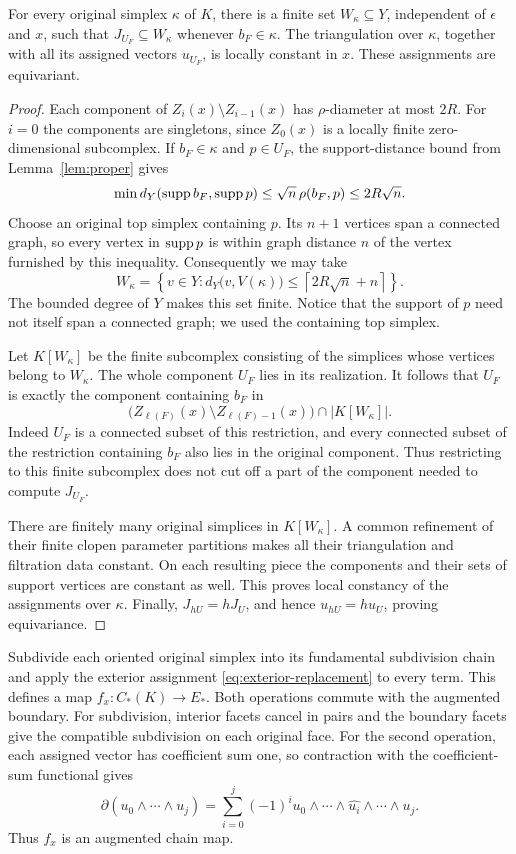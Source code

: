 \begin{lemma}\label{lem:finite-component-labels}
For every original simplex $\kappa$ of $K$, there is a finite set
$W_\kappa\subseteq Y$, independent of $\epsilon$ and $x$, such that
$J_{U_F}\subseteq W_\kappa$ whenever $b_F\in\kappa$. The triangulation
over $\kappa$, together with all its assigned vectors $u_{U_F}$,
is locally constant in $x$. These assignments are equivariant.
\end{lemma}

\begin{proof}
Each component of $Z_i(x)\setminus Z_{i-1}(x)$ has
$\rho$-diameter at most $2R$. For $i=0$ the components are
singletons, since $Z_0(x)$ is a locally finite zero-dimensional
subcomplex. If $b_F\in\kappa$ and $p\in U_F$, the support-distance
bound from Lemma~\ref{lem:proper} gives
\[
 \min d_Y(\operatorname{supp} b_F,\operatorname{supp} p)
 \leq\sqrt n\,\rho(b_F,p)\leq 2R\sqrt n.
\]
Choose an original top simplex containing $p$. Its $n+1$ vertices
span a connected graph, so every vertex in $\operatorname{supp} p$ is within
graph distance $n$ of the vertex furnished by this inequality.
Consequently we may take
\[
 W_\kappa=
 \left\{v\in Y:
 d_Y\bigl(v,V(\kappa)\bigr)
 \leq\left\lceil 2R\sqrt n+n\right\rceil\right\}.
\]
The bounded degree of $Y$ makes this set finite. Notice that the
support of $p$ need not itself span a connected graph; we used
the containing top simplex.

Let $K[W_\kappa]$ be the finite subcomplex consisting of the simplices
whose vertices belong to $W_\kappa$. The whole component $U_F$
lies in its realization. It follows that $U_F$ is exactly the
component containing $b_F$ in
\[
 \bigl(Z_{\ell(F)}(x)\setminus Z_{\ell(F)-1}(x)\bigr)
 \cap |K[W_\kappa]|.
\]
Indeed $U_F$ is a connected subset of this restriction, and every
connected subset of the restriction containing $b_F$ also lies in
the original component. Thus restricting to this finite subcomplex
does not cut off a part of the component needed to compute $J_{U_F}$.

There are finitely many original simplices in $K[W_\kappa]$.
A common refinement of their finite clopen parameter partitions
makes all their triangulation and filtration data constant.
On each resulting piece the components and their sets of support
vertices are constant as well. This proves local constancy of
the assignments over $\kappa$. Finally,
$J_{hU}=hJ_U$, and hence $u_{hU}=h u_U$, proving equivariance.
\end{proof}

Subdivide each oriented original simplex into its fundamental
subdivision chain and apply the exterior assignment
\eqref{eq:exterior-replacement} to every term. This defines a map
$f_x:C_*(K)\to E_*$. Both operations commute
with the augmented boundary. For subdivision, interior facets
cancel in pairs and the boundary facets give the compatible
subdivision on each original face. For the second operation,
each assigned vector has coefficient sum one, so contraction
with the coefficient-sum functional gives
\[
 \partial(u_0\wedge\cdots\wedge u_j)
 =\sum_{i=0}^j(-1)^i
 u_0\wedge\cdots\wedge\widehat{u_i}\wedge\cdots\wedge u_j.
\]
Thus $f_x$ is an augmented chain map.

